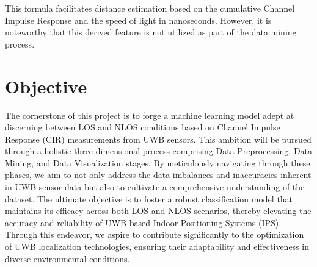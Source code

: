 \documentclass[
	article, %
	11pt, %
	draft, %
]{CSUniSchoolLabReport}
\begin{document}
This formula facilitates distance estimation based on the cumulative Channel Impulse Response and the speed of light in nanoseconds. However, it is noteworthy that this derived feature is not utilized as part of the data mining process.


\section{Objective}\label{objective}
The cornerstone of this project is to forge a machine learning model adept at discerning between LOS and NLOS conditions based on Channel Impulse Response (CIR) measurements from UWB sensors. This ambition will be pursued through a holistic three-dimensional process comprising Data Preprocessing, Data Mining, and Data Visualization stages. By meticulously navigating through these phases, we aim to not only address the data imbalances and inaccuracies inherent in UWB sensor data but also to cultivate a comprehensive understanding of the dataset. The ultimate objective is to foster a robust classification model that maintains its efficacy across both LOS and NLOS scenarios, thereby elevating the accuracy and reliability of UWB-based Indoor Positioning Systems (IPS). Through this endeavor, we aspire to contribute significantly to the optimization of UWB localization technologies, ensuring their adaptability and effectiveness in diverse environmental conditions.




\end{document}
